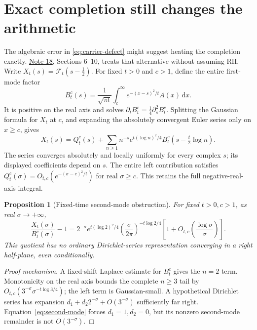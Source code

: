 \documentclass[11pt]{article}
\newtheorem{proposition}[theorem]{Proposition}
\newcommand{\dd}{\,\mathrm d}
\newcommand{\CTref}{\href{../notes/18_ARITHMETIC_HEAT_TRANSFER_AND_EXACT_COMPLETION_20261021.md}{Note 18}}
\begin{document}
\section{Exact completion still changes the arithmetic}\label{sec:completion}
The algebraic error in \eqref{eq:carrier-defect} might suggest heating
the completion exactly. \CTref, Sections 6--10, treats that alternative
without assuming RH. Write \(X_t(s)=\mathcal F_t(s-\frac12)\).
For fixed \(t>0\) and \(c>1\), define the entire first-mode factor
\begin{equation}\label{eq:exact-completion}
 B_t^c(s)=\frac1{\sqrt{\pi t}}\int_c^\infty
                     e^{-(x-s)^2/t}A(x)\dd x.
\end{equation}
It is positive on the real axis and solves
\(\partial_tB_t^c=\frac14\partial_s^2B_t^c\).
Splitting the Gaussian formula for \(X_t\) at \(c\), and expanding
the absolutely convergent Euler series only on \(x\ge c\), gives
\begin{equation}\label{eq:mode-decomposition}
 X_t(s)=Q_t^c(s)+\sum_{n\ge1}n^{-s}e^{t(\log n)^2/4}
                     B_t^c(s-\tfrac t2\log n).
\end{equation}
The series converges absolutely and locally uniformly for every complex
\(s\); its displayed coefficients depend on \(s\). The entire
left contribution satisfies
\(Q_t^c(\sigma)=O_{t,c}(e^{-(\sigma-c)^2/t})\) for real
\(\sigma\ge c\). This retains the full negative-real-axis integral.

\begin{proposition}[Fixed-time second-mode obstruction]
\label{prop:completion}
For fixed \(t>0,c>1\), as real \(\sigma\to+\infty\),
\begin{equation}\label{eq:second-mode}
 \frac{X_t(\sigma)}{B_t^c(\sigma)}-1
 =2^{-\sigma}e^{t(\log2)^2/4}
    \left(\frac{\sigma}{2\pi}\right)^{-t\log2/4}
    \left[1+O_{t,c}\!\left(\frac{\log\sigma}{\sigma}\right)\right].
\end{equation}
This quotient has no ordinary Dirichlet-series representation converging
in a right half-plane, even conditionally.
\end{proposition}
\begin{proof}[Proof mechanism]
A fixed-shift Laplace estimate for \(B_t^c\) gives the \(n=2\)
term. Monotonicity on the real axis bounds the complete \(n\ge3\)
tail by \(O_{t,c}(3^{-\sigma}\sigma^{-t\log3/4})\); the left
term is Gaussian-small. A hypothetical Dirichlet series has expansion
\(d_1+d_2 2^{-\sigma}+O(3^{-\sigma})\) sufficiently far right.
Equation~\eqref{eq:second-mode} forces \(d_1=1,d_2=0\), but its
nonzero second-mode remainder is not \(O(3^{-\sigma})\).
\end{proof}
\end{document}
